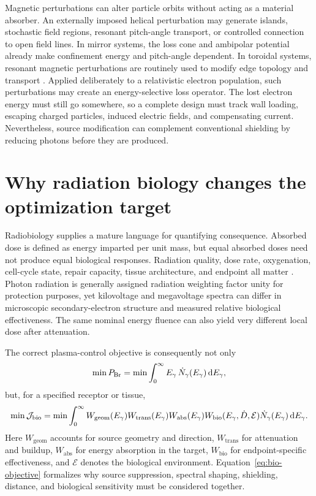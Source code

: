 Magnetic perturbations can alter particle orbits without acting as a material absorber. An externally imposed helical perturbation may generate islands, stochastic field regions, resonant pitch-angle transport, or controlled connection to open field lines. In mirror systems, the loss cone and ambipolar potential already make confinement energy and pitch-angle dependent. In toroidal systems, resonant magnetic perturbations are routinely used to modify edge topology and transport \cite{rechester1978,fitzpatrick1993,evans2004,wesson2011}. Applied deliberately to a relativistic electron population, such perturbations may create an energy-selective loss operator. The lost electron energy must still go somewhere, so a complete design must track wall loading, escaping charged particles, induced electric fields, and compensating current. Nevertheless, source modification can complement conventional shielding by reducing photons before they are produced.

\section{Why radiation biology changes the optimization target}

Radiobiology supplies a mature language for quantifying consequence. Absorbed dose is defined as energy imparted per unit mass, but equal absorbed doses need not produce equal biological responses. Radiation quality, dose rate, oxygenation, cell-cycle state, repair capacity, tissue architecture, and endpoint all matter \cite{baatout2023,hall2018,joiner2018}. Photon radiation is generally assigned radiation weighting factor unity for protection purposes, yet kilovoltage and megavoltage spectra can differ in microscopic secondary-electron structure and measured relative biological effectiveness. The same nominal energy fluence can also yield very different local dose after attenuation.

The correct plasma-control objective is consequently not only
\begin{equation}
\min P_{\mathrm{Br}}=\min\int_0^\infty E_{\gamma}\,\dot N_\gamma(E_{\gamma})\,\mathrm{d} E_{\gamma},
\end{equation}
but, for a specified receptor or tissue,
\begin{equation}
\min \mathcal{J}_{\mathrm{bio}}
=
\min\int_0^\infty
W_{\mathrm{geom}}(E_{\gamma})
W_{\mathrm{trans}}(E_{\gamma})
W_{\mathrm{abs}}(E_{\gamma})
W_{\mathrm{bio}}(E_{\gamma},\dot D,\mathcal{E})
\dot N_\gamma(E_{\gamma})
\,\mathrm{d} E_{\gamma} .
\label{eq:bio-objective}
\end{equation}
Here $W_{\mathrm{geom}}$ accounts for source geometry and direction, $W_{\mathrm{trans}}$ for attenuation and buildup, $W_{\mathrm{abs}}$ for energy absorption in the target, $W_{\mathrm{bio}}$ for endpoint-specific effectiveness, and $\mathcal{E}$ denotes the biological environment. Equation~\eqref{eq:bio-objective} formalizes why source suppression, spectral shaping, shielding, distance, and biological sensitivity must be considered together.

